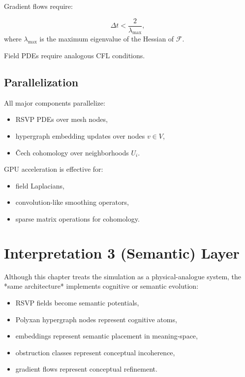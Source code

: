 Gradient flows require:

\[
  \Delta t < \frac{2}{\lambda_{\max}},
\]
where $\lambda_{\max}$ is the maximum eigenvalue of the Hessian of $\mathcal{F}$.

Field PDEs require analogous CFL conditions.

\subsection{Parallelization}

All major components parallelize:

\begin{itemize}
  \item RSVP PDEs over mesh nodes,
  \item hypergraph embedding updates over nodes $v\in V$,
  \item Čech cohomology over neighborhoods $U_i$.
\end{itemize}

GPU acceleration is effective for:

\begin{itemize}
  \item field Laplacians,
  \item convolution-like smoothing operators,
  \item sparse matrix operations for cohomology.
\end{itemize}


\section{Interpretation 3 (Semantic) Layer}

Although this chapter treats the simulation as a physical-analogue system,
the *same architecture* implements cognitive or semantic evolution:

\begin{itemize}
  \item RSVP fields become semantic potentials,
  \item Polyxan hypergraph nodes represent cognitive atoms,
  \item embeddings represent semantic placement in meaning-space,
  \item obstruction classes represent conceptual incoherence,
  \item gradient flows represent conceptual refinement.
\end{itemize}

